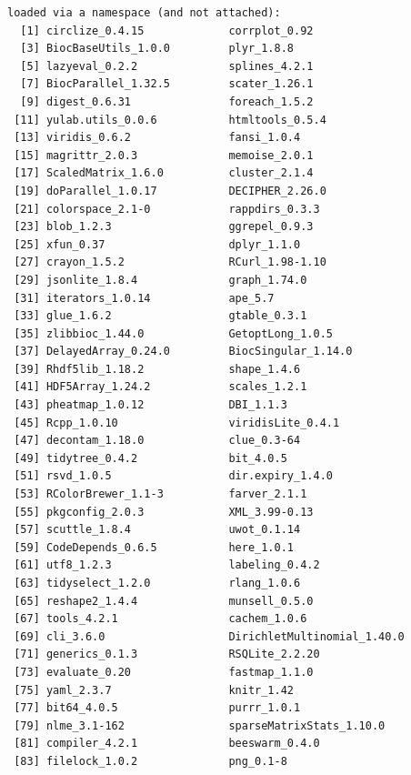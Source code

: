 \documentclass[
]{book}
\begin{document}
\begin{verbatim}
loaded via a namespace (and not attached):
  [1] circlize_0.4.15             corrplot_0.92              
  [3] BiocBaseUtils_1.0.0         plyr_1.8.8                 
  [5] lazyeval_0.2.2              splines_4.2.1              
  [7] BiocParallel_1.32.5         scater_1.26.1              
  [9] digest_0.6.31               foreach_1.5.2              
 [11] yulab.utils_0.0.6           htmltools_0.5.4            
 [13] viridis_0.6.2               fansi_1.0.4                
 [15] magrittr_2.0.3              memoise_2.0.1              
 [17] ScaledMatrix_1.6.0          cluster_2.1.4              
 [19] doParallel_1.0.17           DECIPHER_2.26.0            
 [21] colorspace_2.1-0            rappdirs_0.3.3             
 [23] blob_1.2.3                  ggrepel_0.9.3              
 [25] xfun_0.37                   dplyr_1.1.0                
 [27] crayon_1.5.2                RCurl_1.98-1.10            
 [29] jsonlite_1.8.4              graph_1.74.0               
 [31] iterators_1.0.14            ape_5.7                    
 [33] glue_1.6.2                  gtable_0.3.1               
 [35] zlibbioc_1.44.0             GetoptLong_1.0.5           
 [37] DelayedArray_0.24.0         BiocSingular_1.14.0        
 [39] Rhdf5lib_1.18.2             shape_1.4.6                
 [41] HDF5Array_1.24.2            scales_1.2.1               
 [43] pheatmap_1.0.12             DBI_1.1.3                  
 [45] Rcpp_1.0.10                 viridisLite_0.4.1          
 [47] decontam_1.18.0             clue_0.3-64                
 [49] tidytree_0.4.2              bit_4.0.5                  
 [51] rsvd_1.0.5                  dir.expiry_1.4.0           
 [53] RColorBrewer_1.1-3          farver_2.1.1               
 [55] pkgconfig_2.0.3             XML_3.99-0.13              
 [57] scuttle_1.8.4               uwot_0.1.14                
 [59] CodeDepends_0.6.5           here_1.0.1                 
 [61] utf8_1.2.3                  labeling_0.4.2             
 [63] tidyselect_1.2.0            rlang_1.0.6                
 [65] reshape2_1.4.4              munsell_0.5.0              
 [67] tools_4.2.1                 cachem_1.0.6               
 [69] cli_3.6.0                   DirichletMultinomial_1.40.0
 [71] generics_0.1.3              RSQLite_2.2.20             
 [73] evaluate_0.20               fastmap_1.1.0              
 [75] yaml_2.3.7                  knitr_1.42                 
 [77] bit64_4.0.5                 purrr_1.0.1                
 [79] nlme_3.1-162                sparseMatrixStats_1.10.0   
 [81] compiler_4.2.1              beeswarm_0.4.0             
 [83] filelock_1.0.2              png_0.1-8                  

\end{verbatim}
\end{document}
